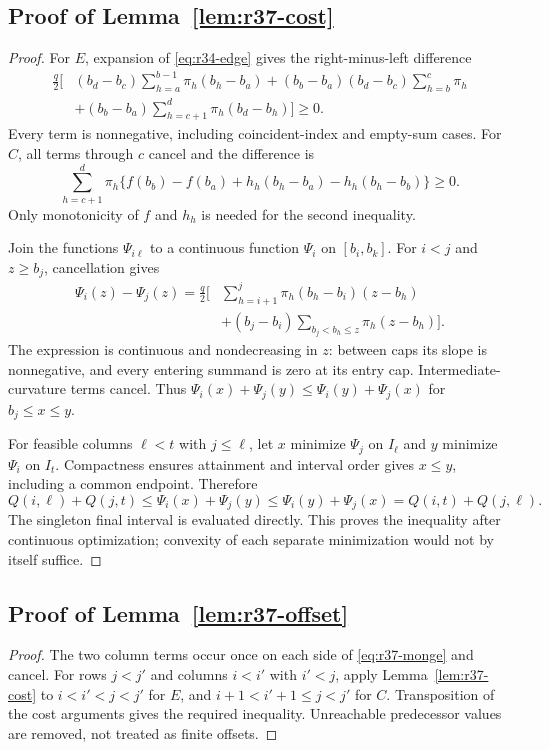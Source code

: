 \subsection{Proof of Lemma~\ref{lem:r37-cost}}\label{ec-proof-lem-r37-cost}
\begin{proof}
For $E$, expansion of \eqref{eq:r34-edge} gives the right-minus-left difference
\begin{align*}
 \frac q2\biggl[&(b_d-b_c)\sum_{h=a}^{b-1}\pi_h(b_h-b_a)
 +(b_b-b_a)(b_d-b_c)\sum_{h=b}^{c}\pi_h\\
 &+(b_b-b_a)\sum_{h=c+1}^{d}\pi_h(b_d-b_h)\biggr]\geq0.
\end{align*}
Every term is nonnegative, including coincident-index and empty-sum cases. For $C$, all terms through $c$ cancel and the difference is
\[
 \sum_{h=c+1}^{d}\pi_h\{f(b_b)-f(b_a)+h_h(b_h-b_a)-h_h(b_h-b_b)\}\geq0.
\]
Only monotonicity of $f$ and $h_h$ is needed for the second inequality.

Join the functions $\Psi_{i\ell}$ to a continuous function $\Psi_i$ on $[b_i,b_k]$. For $i<j$ and $z\geq b_j$, cancellation gives
\begin{align}
 \Psi_i(z)-\Psi_j(z)=\frac q2\biggl[&\sum_{h=i+1}^{j}\pi_h(b_h-b_i)(z-b_h)\nonumber\\
 &+(b_j-b_i)\sum_{b_j<b_h\leq z}\pi_h(z-b_h)\biggr].\label{eq:r37-crossing}
\end{align}
The expression is continuous and nondecreasing in $z$: between caps its slope is nonnegative, and every entering summand is zero at its entry cap. Intermediate-curvature terms cancel. Thus $\Psi_i(x)+\Psi_j(y)\leq\Psi_i(y)+\Psi_j(x)$ for $b_j\leq x\leq y$.

For feasible columns $\ell<t$ with $j\leq\ell$, let $x$ minimize $\Psi_j$ on $I_\ell$ and $y$ minimize $\Psi_i$ on $I_t$. Compactness ensures attainment and interval order gives $x\leq y$, including a common endpoint. Therefore
\[
 Q(i,\ell)+Q(j,t)\leq\Psi_i(x)+\Psi_j(y)
 \leq\Psi_i(y)+\Psi_j(x)=Q(i,t)+Q(j,\ell).
\]
The singleton final interval is evaluated directly. This proves the inequality after continuous optimization; convexity of each separate minimization would not by itself suffice.
\end{proof}
\subsection{Proof of Lemma~\ref{lem:r37-offset}}\label{ec-proof-lem-r37-offset}
\begin{proof}
The two column terms occur once on each side of \eqref{eq:r37-monge} and cancel. For rows $j<j'$ and columns $i<i'$ with $i'<j$, apply Lemma~\ref{lem:r37-cost} to $i<i'<j<j'$ for $E$, and $i+1<i'+1\leq j<j'$ for $C$. Transposition of the cost arguments gives the required inequality. Unreachable predecessor values are removed, not treated as finite offsets.
\end{proof}
